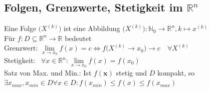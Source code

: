 \documentclass[6pt,a4paper]{scrartcl}
\newcommand{\norm}[1]{\ensuremath{\|#1\|}}														%
\renewcommand{\vec}[1]{\ensuremath{\boldsymbol {#1}}}											%
\begin{document}
\begin{multicols*}{4}
\subsection{Folgen, Grenzwerte, Stetigkeit im $\mathbb R^n$}
Eine Folge $\bigl( X^{(k)} \bigr)$ ist eine Abbildung $\bigl(X^{(k)}\bigr):\mathbb N_0 \rightarrow \mathbb R^n, k\mapsto x^{(k)}$\\
Für $f:D \subseteq \mathbb R^n \rightarrow \mathbb R$ bedeutet \\
Grenzwert: \quad  $\lim\limits_{x \rightarrow x_0} f(x) =c \Leftrightarrow f \bigl(X^{(k)} \rightarrow x_0 \bigr) \rightarrow c\quad \forall X^{(k)}$\\
Stetigkeit: \quad \ $\forall x \in \mathbb R^n:\lim\limits_{x \rightarrow x_0} f(x) = f(x_0)$\\
Satz von Max. und Min.: Ist $f(\vec x)$ stetig und $D$ kompakt, so\\
$\exists x_{max},x_{min} \in D \forall x\in D:f(x_{min}) \le f(x) \le f(x_{max})$


\end{multicols*}
\end{document}
